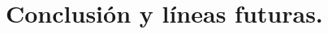 \chapter{Conclusión y líneas futuras.}
\label{cap:capitulo7}

\clearpage{\cleardoublepage}
\clearpage{\pagestyle{empty}\cleardoublepage}